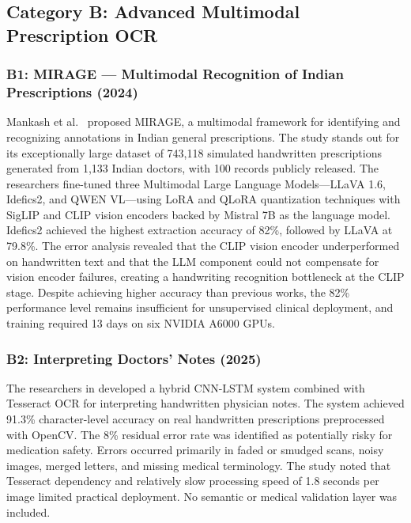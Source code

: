 \documentclass[conference]{IEEEtran}
\begin{document}
\subsection{Category B: Advanced Multimodal Prescription OCR}

\subsubsection{B1: MIRAGE --- Multimodal Recognition of Indian Prescriptions (2024)}

Mankash et al.\ \cite{mankash2024mirage} proposed MIRAGE, a multimodal framework for identifying and recognizing annotations in Indian general prescriptions. The study stands out for its exceptionally large dataset of 743,118 simulated handwritten prescriptions generated from 1,133 Indian doctors, with 100 records publicly released. The researchers fine-tuned three Multimodal Large Language Models---LLaVA 1.6, Idefics2, and QWEN VL---using LoRA and QLoRA quantization techniques with SigLIP and CLIP vision encoders backed by Mistral 7B as the language model. Idefics2 achieved the highest extraction accuracy of 82\%, followed by LLaVA at 79.8\%. The error analysis revealed that the CLIP vision encoder underperformed on handwritten text and that the LLM component could not compensate for vision encoder failures, creating a handwriting recognition bottleneck at the CLIP stage. Despite achieving higher accuracy than previous works, the 82\% performance level remains insufficient for unsupervised clinical deployment, and training required 13 days on six NVIDIA A6000 GPUs.

\subsubsection{B2: Interpreting Doctors' Notes (2025)}

The researchers in \cite{intuitionlabs2026pharma} developed a hybrid CNN-LSTM system combined with Tesseract OCR for interpreting handwritten physician notes. The system achieved 91.3\% character-level accuracy on real handwritten prescriptions preprocessed with OpenCV. The 8\% residual error rate was identified as potentially risky for medication safety. Errors occurred primarily in faded or smudged scans, noisy images, merged letters, and missing medical terminology. The study noted that Tesseract dependency and relatively slow processing speed of 1.8 seconds per image limited practical deployment. No semantic or medical validation layer was included.
\end{document}
